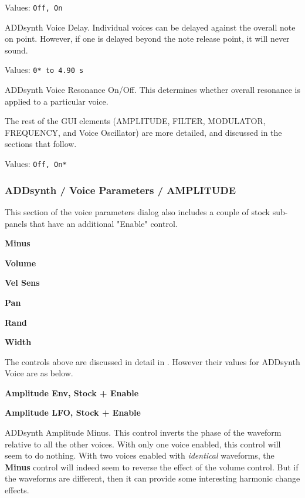    Values: \texttt{Off, On}

   ADDsynth Voice Delay.
   Individual voices can be delayed against the overall note on point.
   However, if one is delayed beyond the note release point, it will never sound.

   Values: \texttt{0* to 4.90 s}

   ADDsynth Voice Resonance On/Off.
   This determines whether overall resonance is applied to a particular voice.

   The rest of the GUI elements
   (AMPLITUDE, FILTER, MODULATOR, FREQUENCY, and Voice Oscillator)
   are more detailed, and discussed in the sections that follow.

   Values: \texttt{Off, On*}

\subsubsection{ADDsynth / Voice Parameters / AMPLITUDE}
\label{subsubsec:addsynth_voice_parameters_amplitude}

   This section of the voice parameters dialog also includes a couple of
   stock sub-panels that have an additional "Enable" control.

   \begin{enumber}
      \item \textbf{Minus}
      \item \textbf{Volume}
      \item \textbf{Vel Sens}
      \item \textbf{Pan}
      \item \textbf{Rand}
      \item \textbf{Width}

      The controls above are discussed in detail in
       . However their values for ADDsynth
       Voice are as below.

      \item \textbf{Amplitude Env, Stock + Enable}
      \item \textbf{Amplitude LFO, Stock + Enable}
   \end{enumber}

   \setcounter{ItemCounter}{0}      %

   ADDsynth Amplitude Minus.
   This control inverts the phase of the waveform relative to
   all the other voices.
   With only one voice enabled, this control will seem to do nothing.
   With two voices enabled with \textsl{identical} waveforms, the
   \textbf{Minus} control will indeed seem to reverse the effect of the volume
   control. But if the waveforms are different, then it can provide some
   interesting harmonic change effects.


